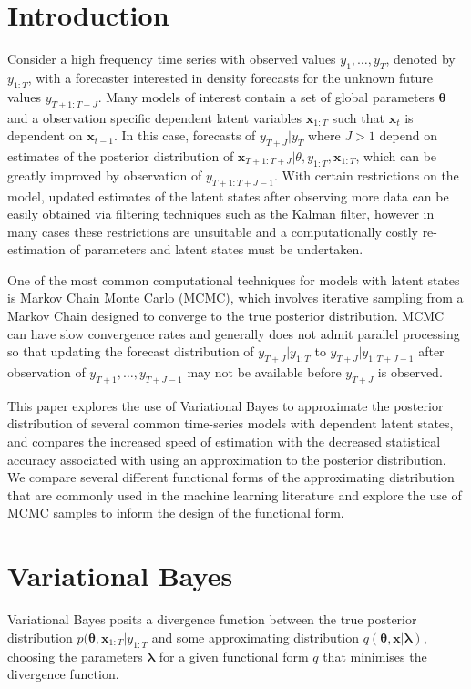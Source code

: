 \documentclass[12pt,a4paper]{article}%
\numberwithin{equation}{section}
\begin{document}
\section{Introduction}


Consider a high frequency time series with observed values $y_{1}, \dots, y_{T}$, denoted by $y_{1:T}$, with a forecaster interested in density forecasts for the unknown future values $y_{T+1:T+J}$. Many models of interest contain a set of global parameters $\boldsymbol{\theta}$ and a observation specific dependent latent variables $\textbf{x}_{1:T}$ such that $\textbf{x}_t$ is dependent on $\textbf{x}_{t-1}$. In this case, forecasts of $y_{T+J} | y_{T}$ where $J > 1$ depend on estimates of the posterior distribution of $\textbf{x}_{T+1:T+J} | \theta, y_{1:T}, \textbf{x}_{1:T}$, which can be greatly improved by observation of $y_{T+1:T+J-1}$. With certain restrictions on the model, updated estimates of the latent states after observing more data can be easily obtained via filtering techniques such as the Kalman filter, however in many cases these restrictions are unsuitable and a computationally costly re-estimation of parameters and latent states must be undertaken.

One of the most common computational techniques for models with latent states is Markov Chain Monte Carlo (MCMC), which involves iterative sampling from a Markov Chain designed to converge to the true posterior distribution. MCMC can have slow convergence rates and generally does not admit parallel processing so that updating the forecast distribution of $y_{T+J} | y_{1:T}$ to $y_{T+J} | y_{1:T+J-1}$ after observation of $y_{T+1}, \dots, y_{T+J-1}$ may not be available before $y_{T+J}$ is observed.

This paper explores the use of Variational Bayes to approximate the posterior distribution of several common time-series models with dependent latent states, and compares the increased speed of estimation with the decreased statistical accuracy associated with using an approximation to the posterior distribution. We compare several different functional forms of the approximating distribution that are commonly used in the machine learning literature and explore the use of MCMC samples to inform the design of the functional form.

\section{Variational Bayes}


Variational Bayes posits a divergence function between the true posterior distribution $p(\boldsymbol{\theta}, \textbf{x}_{1:T} | y_{1:T}$ and some approximating distribution $q(\boldsymbol{\theta}, \textbf{x} | \boldsymbol{\lambda})$, choosing the parameters $\boldsymbol{\lambda}$ for a given functional form $q$ that minimises the divergence function.
\end{document}
